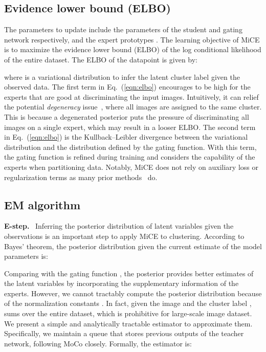 \documentclass{article} \usepackage{iclr2021_conference,times}
\begin{document}
\subsection{Evidence lower bound (ELBO)}\label{sec.elbo}
The parameters to update include the parameters  of the student and gating network respectively, and the expert prototypes .
The learning objective of MiCE is to maximize the evidence lower bound (ELBO) of the log conditional likelihood  of the entire dataset. The ELBO of the datapoint  is given by:

where  is a variational distribution to infer the latent cluster label given the observed data. 
The first term in Eq.~(\ref{eqn:elbo}) encourages   to be high for the experts that are good at discriminating the input images. Intuitively, it can relief the potential {\it degeneracy} issue~\citep{caron2018deep,ji2019invariant}, where all images are assigned to the same cluster. This is because a degenerated posterior puts the pressure of discriminating all images on a single expert, which may result in a looser ELBO.
The second term in Eq.~(\ref{eqn:elbo}) is the Kullback–Leibler divergence between the variational distribution and the distribution defined by the gating function. With this term, the gating function is refined during training and considers the capability of the experts when partitioning data. Notably, MiCE does not rely on auxiliary loss or regularization terms as many prior methods~\citep{haeusser2018associative,shiran2019multi,wu2019deep,niu2020gatcluster} do. 











\subsection{EM algorithm}\label{sec.em}






{\bf E-step.}~\label{Sec_estep} Inferring the posterior distribution of latent variables given the observations is an important step to apply MiCE to clustering. According to Bayes' theorem, the posterior distribution given the current estimate of the model parameters is:

Comparing with the gating function , the posterior provides better estimates of the latent variables by incorporating the supplementary information of the experts. However, we cannot tractably compute the posterior distribution because of the normalization constants . In fact,
given the image  and the cluster label ,  sums over the entire dataset, which is prohibitive for large-scale image dataset.
We present a simple and analytically tractable estimator to approximate them. Specifically, we maintain a queue  that stores  previous outputs of the teacher network, following MoCo closely. Formally, the estimator  is:
\end{document}
